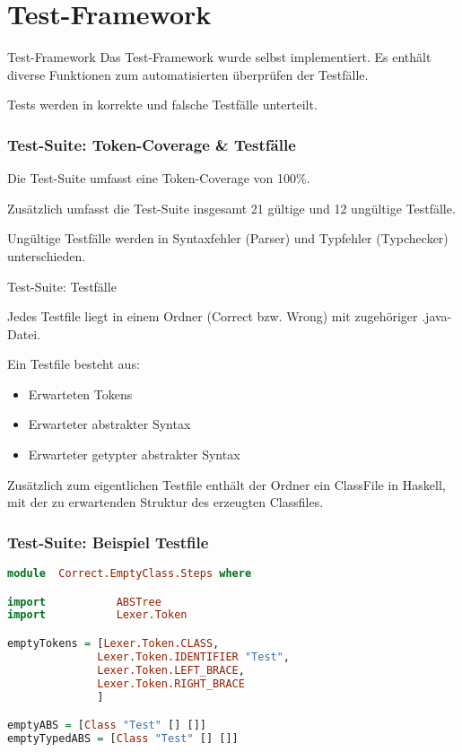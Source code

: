 \section{Test-Framework}

\begin{frame}{Test-Framework}
Das Test-Framework wurde selbst implementiert. Es enthält diverse Funktionen zum automatisierten überprüfen der Testfälle.

\par \medskip

Tests werden in korrekte und falsche Testfälle unterteilt.


\end{frame}

\begin{frame}[fragile]
	\frametitle{Test-Suite: Token-Coverage \& Testfälle}
	
Die Test-Suite umfasst eine Token-Coverage von 100\%. 

\par \medskip

Zusätzlich umfasst die Test-Suite insgesamt 21 gültige und 12 ungültige Testfälle.

\par \medskip

Ungültige Testfälle werden in Syntaxfehler (Parser) und Typfehler (Typchecker) unterschieden.
\end{frame}

\begin{frame}{Test-Suite: Testfälle}

Jedes Testfile liegt in einem Ordner (Correct bzw. Wrong) mit zugehöriger .java-Datei. 	

\par \medskip

Ein Testfile besteht aus: 

\begin{itemize}
	\item Erwarteten Tokens
	\item Erwarteter abstrakter Syntax
	\item Erwarteter getypter abstrakter Syntax
\end{itemize}

Zusätzlich zum eigentlichen Testfile enthält der Ordner ein ClassFile in Haskell, mit der zu erwartenden Struktur des erzeugten Classfiles.
\end{frame}

\begin{frame}[fragile]
\frametitle{Test-Suite: Beispiel Testfile}
\begin{lstlisting}[language=Haskell]
module  Correct.EmptyClass.Steps where

import           ABSTree
import           Lexer.Token

emptyTokens = [Lexer.Token.CLASS,
              Lexer.Token.IDENTIFIER "Test",
              Lexer.Token.LEFT_BRACE,
              Lexer.Token.RIGHT_BRACE
              ]

emptyABS = [Class "Test" [] []]
emptyTypedABS = [Class "Test" [] []]	
\end{lstlisting}
	
\end{frame}

